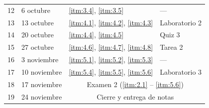 \begin{longtable}{p{1.2cm}p{3.2cm}p{4.5cm}p{2.8cm}}
12 &
6 octubre &
\ref{itm:3.4}, \ref{itm:3.5}
&
---
\\
\addlinespace

13 &
13 octubre &
\ref{itm:4.1}, \ref{itm:4.2}, \ref{itm:4.3}
&
Laboratorio 2
\\
\addlinespace

14 &
20 octubre &
\ref{itm:4.4}, \ref{itm:4.5}
&
Quiz 3
\\
\addlinespace

15 &
27 octubre &
\ref{itm:4.6}, \ref{itm:4.7}, \ref{itm:4.8}
&
Tarea 2
\\
\addlinespace

16 &
3 noviembre &
\ref{itm:5.1}, \ref{itm:5.2}, \ref{itm:5.3}
&
---
\\
\addlinespace

17 &
10 noviembre &
\ref{itm:5.4}, \ref{itm:5.5}, \ref{itm:5.6}
&
Laboratorio 3
\\
\addlinespace

\rowcolor{yellow!20}
18 &
17 noviembre &
\multicolumn{2}{c}{Examen 2 (\ref{itm:2.1} -- \ref{itm:5.6})}
\\
\addlinespace

19 &
24 noviembre &
\multicolumn{2}{c}{Cierre y entrega de notas}
\\
\end{longtable}
